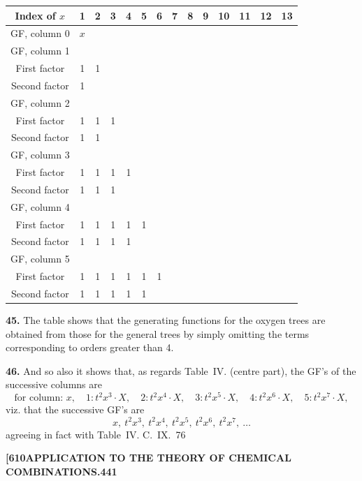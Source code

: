 \documentclass[11pt,a4paper]{book}
\begin{document}
{\begin{center}
\small
\begin{tabular}{|c|c|c|c|c|c|c|c|c|c|c|c|c|c|}
\hline
Index of $x$ & 1 & 2 & 3 & 4 & 5 & 6 & 7 & 8 & 9 & 10 & 11 & 12 & 13 \\
\hline
GF, column 0 & $x$ & & & & & & & & & & & & \\
\hline
GF, column 1 & & & & & & & & & & & & & \\
First factor & 1 & 1 & & & & & & & & & & & \\
Second factor & 1 & & & & & & & & & & & & \\
\hline
GF, column 2 & & & & & & & & & & & & & \\
First factor & 1 & 1 & 1 & & & & & & & & & & \\
Second factor & 1 & 1 & & & & & & & & & & & \\
\hline
GF, column 3 & & & & & & & & & & & & & \\
First factor & 1 & 1 & 1 & 1 & & & & & & & & & \\
Second factor & 1 & 1 & 1 & & & & & & & & & & \\
\hline
GF, column 4 & & & & & & & & & & & & & \\
First factor & 1 & 1 & 1 & 1 & 1 & & & & & & & & \\
Second factor & 1 & 1 & 1 & 1 & & & & & & & & & \\
\hline
GF, column 5 & & & & & & & & & & & & & \\
First factor & 1 & 1 & 1 & 1 & 1 & 1 & & & & & & & \\
Second factor & 1 & 1 & 1 & 1 & 1 & & & & & & & & \\
\hline
\end{tabular}
\end{center}

\medskip
\noindent\textbf{45.}
The table shows that the generating functions for the oxygen trees are obtained from those for the general trees by simply omitting the terms corresponding to orders greater than 4.

\medskip
\noindent\textbf{46.}
And so also it shows that, as regards Table~IV. (centre part), the GF's of the successive columns are
\[
\text{for column: } x,\quad 1: t^2x^3 \cdot X,\quad 2: t^2x^4 \cdot X,\quad 3: t^2x^5 \cdot X,\quad 4: t^2x^6 \cdot X,\quad 5: t^2x^7 \cdot X,
\]
viz. that the successive GF's are
\[
x,\ t^2x^3,\ t^2x^4,\ t^2x^5,\ t^2x^6,\ t^2x^7,\ \ldots
\]
agreeing in fact with Table~IV.
\hfill C.~IX.\ 76

\newpage
\noindent\textbf{[610}\hspace{\fill}\textbf{APPLICATION TO THE THEORY OF CHEMICAL COMBINATIONS.}\hspace{\fill}\textbf{441}

}
\end{document}
